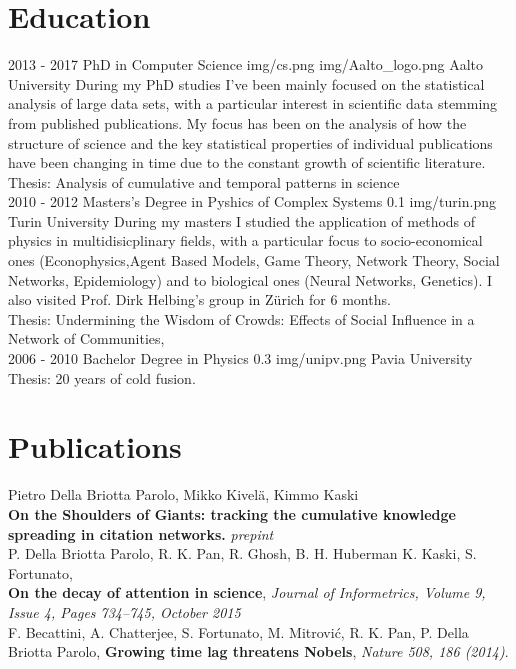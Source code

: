 \documentclass[]{friggeri-cv}
\begin{document}
\section{Education}
\begin{entrylist}

  \aaltoentry
    {2013 - 2017}
    {PhD in Computer Science}
{img/cs.png}
{img/Aalto_logo.png}
{Aalto University}
{During my PhD studies I've been mainly focused on the statistical analysis of large data sets, with a particular interest in
scientific data stemming from published publications. My focus has been on the analysis of how the structure of science and
the key statistical properties of individual publications have been changing in time due to the constant growth of scientific
literature.\\
Thesis: Analysis of cumulative and temporal patterns in science
}
\\

\unientry
    {2010 - 2012}
    {Masters's Degree in Pyshics of Complex Systems}
    {0.1}
   {img/turin.png}
    {Turin University}
    {During my masters I studied the application of methods of physics in multidisicplinary fields, with a particular focus
    to socio-economical ones (Econophysics,Agent Based Models, Game Theory, Network Theory, Social Networks, Epidemiology) and to biological ones
    (Neural Networks, Genetics). I also visited Prof. Dirk Helbing's group in Z\"urich for 6 months.\\
     Thesis: Undermining the Wisdom of Crowds: Effects of Social Influence in a Network of Communities,
}
\\
\unientry
    {2006 - 2010}
    {Bachelor Degree in Physics}
    {0.3}
    {img/unipv.png}
    {Pavia University}
{ Thesis: 20 years of cold fusion.}


\end{entrylist}





\section{Publications}

 Pietro Della Briotta Parolo, Mikko Kivel\"a, Kimmo Kaski\\
\textbf{On the Shoulders of
Giants: tracking the cumulative knowledge spreading in citation networks.}
\emph{prepint}
\\
P. Della Briotta Parolo, R. K. Pan, R. Ghosh, B. H. Huberman
K. Kaski, S. Fortunato, \\
\textbf{On the decay of attention in science}, 
\emph {Journal of Informetrics, Volume 9, Issue 4,  Pages 734–745, October 2015}
\\
F. Becattini, A. Chatterjee, S. Fortunato, M. Mitrović, R. K. Pan, P.
Della Briotta Parolo,
\textbf{Growing time lag threatens Nobels}, 
\emph{Nature 508, 186 (2014)}.
\\
\end{document}
